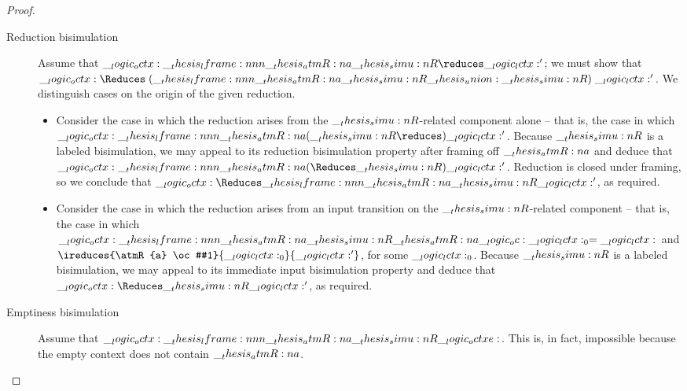 \begin{proof}
\begin{description}
  \item[Reduction bisimulation]
    Assume that $\octx \lframe{\atmR{a}}{\simu{R}}\reduces \lctx'$; we must show that $\octx \Reduces\mathrel{(\lframe{\atmR{a}}{\simu{R}} \union \simu{R})} \lctx'$.
    We distinguish cases on the origin of the given reduction.
    \begin{itemize}
    \item
      Consider the case in which the reduction arises from the $\__thesis_simu:n {R}$-related component alone -- that is, the case in which $\octx \lframe{\atmR{a}}{(\simu{R}\reduces)} \lctx'$.
      Because $\__thesis_simu:n {R}$ is a labeled bisimulation, we may appeal to its reduction bisimulation property after framing off $\__thesis_atmR:n {a}$ and deduce that $\octx \lframe{\atmR{a}}{(\Reduces\simu{R})} \lctx'$.
      Reduction is closed under framing, so we conclude that $\octx \Reduces\lframe{\atmR{a}}{\simu{R}} \lctx'$, as required.
    \item
      Consider the case in which the reduction arises from an input transition on the $\__thesis_simu:n {R}$-related component -- that is, the case in which $\octx \lframe{\atmR{a}}{\simu{R}} \atmR{a} \oc \lctx_0 = \lctx$ and $\ireduces{\atmR{a} \oc #1}{\lctx_0}{\lctx'}$, for some $\__logic_lctx:_0$.
      Because $\__thesis_simu:n {R}$ is a labeled bisimulation, we may appeal to its immediate input bisimulation property and deduce that $\octx \Reduces\simu{R} \lctx'$, as required.
    \end{itemize}

  \item[Emptiness bisimulation]
    Assume that $\octx \lframe{\atmR{a}}{\simu{R}} \octxe$.
    This is, in fact, impossible because the empty context does not contain $\__thesis_atmR:n {a}$.
  \qedhere
  \end{description}
\end{proof}


